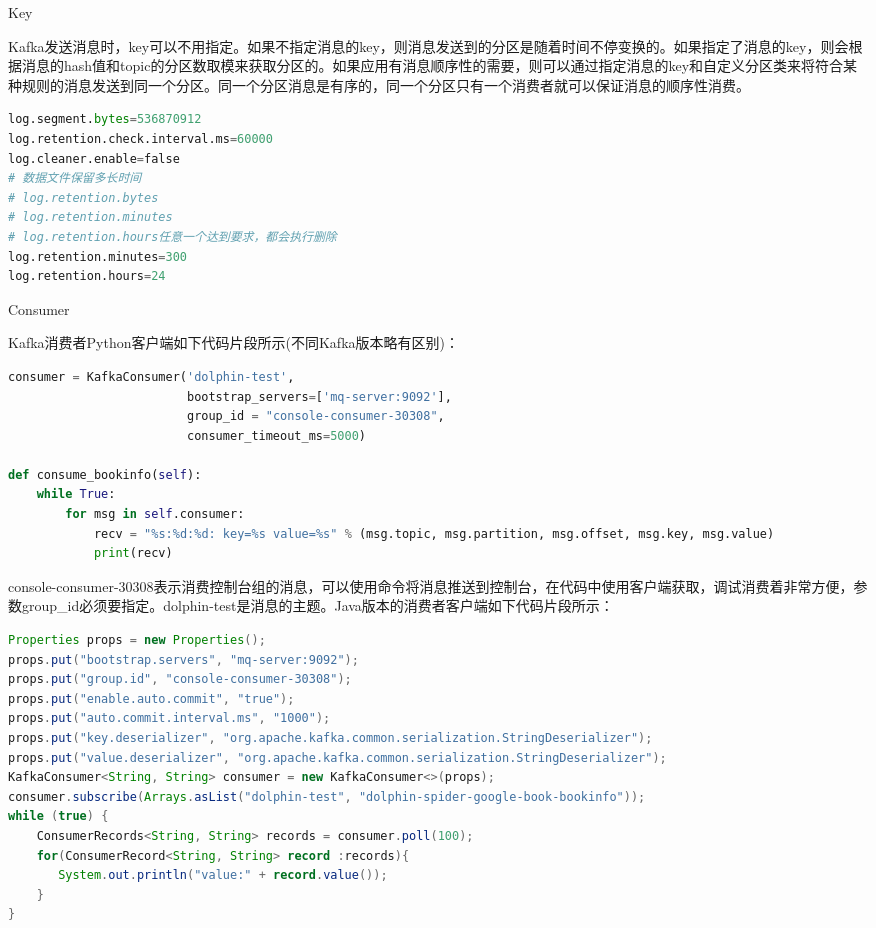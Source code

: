\documentclass[8pt]{book}
\makeatletter
\numberwithin{dummy}{section}
\theoremstyle{ocrenumbox}
\theoremstyle{blacknumex}
\theoremstyle{blacknumbox}
\theoremstyle{ocrenum}
\renewcommand{\subsection}{\@startsection {subsection}{2}{\z@}
	{-3ex \@plus -0.1ex \@minus -.4ex}
	{0.5ex \@plus.2ex }
	{\normalfont\sffamily\bfseries}}
\renewcommand{\subsubsection}{\@startsection {subsubsection}{3}{\z@}
	{-2ex \@plus -0.1ex \@minus -.2ex}
	{.2ex \@plus.2ex }
	{\normalfont\small\sffamily\bfseries}}
\makeatother
\begin{document}
\subsubsection{Key}

Kafka发送消息时，key可以不用指定。如果不指定消息的key，则消息发送到的分区是随着时间不停变换的。如果指定了消息的key，则会根据消息的hash值和topic的分区数取模来获取分区的。如果应用有消息顺序性的需要，则可以通过指定消息的key和自定义分区类来将符合某种规则的消息发送到同一个分区。同一个分区消息是有序的，同一个分区只有一个消费者就可以保证消息的顺序性消费。

\begin{lstlisting}[language=Python]
log.segment.bytes=536870912
log.retention.check.interval.ms=60000
log.cleaner.enable=false
# 数据文件保留多长时间
# log.retention.bytes
# log.retention.minutes
# log.retention.hours任意一个达到要求，都会执行删除
log.retention.minutes=300
log.retention.hours=24
\end{lstlisting}



\subsection{Consumer}

Kafka消费者Python客户端如下代码片段所示(不同Kafka版本略有区别)：


\begin{lstlisting}[language=Python]
consumer = KafkaConsumer('dolphin-test',
                         bootstrap_servers=['mq-server:9092'],
                         group_id = "console-consumer-30308",
                         consumer_timeout_ms=5000)

def consume_bookinfo(self):
    while True:        
        for msg in self.consumer:
            recv = "%s:%d:%d: key=%s value=%s" % (msg.topic, msg.partition, msg.offset, msg.key, msg.value)
            print(recv)
\end{lstlisting}

console-consumer-30308表示消费控制台组的消息，可以使用命令将消息推送到控制台，在代码中使用客户端获取，调试消费着非常方便，参数group\_id必须要指定。dolphin-test是消息的主题。Java版本的消费者客户端如下代码片段所示：

\begin{lstlisting}[language=Java]
Properties props = new Properties();
props.put("bootstrap.servers", "mq-server:9092");
props.put("group.id", "console-consumer-30308");
props.put("enable.auto.commit", "true");
props.put("auto.commit.interval.ms", "1000");
props.put("key.deserializer", "org.apache.kafka.common.serialization.StringDeserializer");
props.put("value.deserializer", "org.apache.kafka.common.serialization.StringDeserializer");
KafkaConsumer<String, String> consumer = new KafkaConsumer<>(props);
consumer.subscribe(Arrays.asList("dolphin-test", "dolphin-spider-google-book-bookinfo"));
while (true) {
    ConsumerRecords<String, String> records = consumer.poll(100);
    for(ConsumerRecord<String, String> record :records){
       System.out.println("value:" + record.value());
    }
}
\end{lstlisting}
\end{document}
